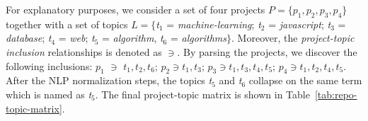 


For explanatory purposes, we consider a set of four projects 
$P=\{p_1,p_2,p_3,p_4 \}$ together with a set of topics $L=\{$\emph{t$_1$} = 
\emph{machine-learning}; \emph{t$_2$} = \emph{javascript}; \emph{t$_3$} = 
\emph{database}; \emph{t$_4$} = \emph{web}; \emph{t$_5$} = \emph{algorithm}, 
\emph{t$_6$} = \emph{algorithms}$\}$. Moreover, the \emph{project-topic 
inclusion} relationships is denoted as $\ni$. By parsing the projects, we 
discover the following inclusions: $p_1$ $\ni$ $t_1,t_2, t_6$; $p_2 \ni 
t_1,t_3$; $p_3 \ni t_1 ,t_3, t_4, t_5$; $p_4 \ni t_1,t_2,t_4,t_5$. After the 
NLP normalization steps, the topics \emph{t$_5$} and \emph{t$_6$} collapse on 
the same term which is named as \emph{t$_{5}$}. The final project-topic matrix 
is shown in Table~\ref{tab:repo-topic-matrix}. 

